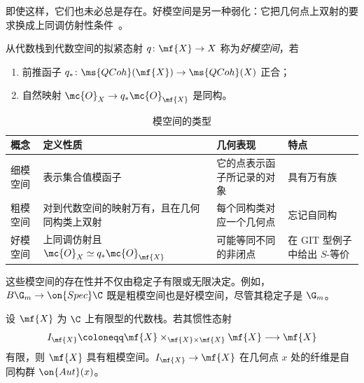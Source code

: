 即使这样，它们也未必总是存在。好模空间是另一种弱化：它把几何点上双射的要求换成上同调仿射性条件~\cite{Alper2013}。

\begin{defn}
    从代数栈到代数空间的拟紧态射 \(q\colon\mf{X}\to X\) 称为\textit{好模空间}，若
    \begin{enumerate}
        \item 前推函子 \(q_*\colon\ms{QCoh}(\mf{X})\to\ms{QCoh}(X)\) 正合；
        \item 自然映射 \(\mc{O}_X\to q_*\mc{O}_{\mf{X}}\) 是同构。
    \end{enumerate}
\end{defn}

\begin{table}[htpb]
    \centering
    \caption{模空间的类型}
    \label{tab:moduli-types-corrected}
    \renewcommand{\arraystretch}{1.3}
    \begin{tabular}{
        p{}
        p{}
        p{}
        p{}
    }
        \toprule
        \textbf{概念}
        & \textbf{定义性质}
        & \textbf{几何表现}
        & \textbf{特点}
        \\
        \midrule
        细模空间
        & 表示集合值模函子
        & 它的点表示函子所记录的对象
        & 具有万有族
        \\
        粗模空间
        & 对到代数空间的映射万有，且在几何同构类上双射
        & 每个同构类对应一个几何点
        & 忘记自同构
        \\
        好模空间
        & 上同调仿射且
          \(\mc{O}_X \simeq q_*\mc{O}_{\mf{X}}\)
        & 可能等同不同的非闭点
        & 在 GIT 型例子中给出 \(S\)-等价
        \\
        \bottomrule
    \end{tabular}
\end{table}

这些模空间的存在性并不仅由稳定子有限或无限决定。例如，\(B\G_m\to\on{Spec}\C\) 既是粗模空间也是好模空间，尽管其稳定子是 \(\G_m\)。

\begin{thm}
    设 \(\mf{X}\) 为 \(\C\) 上有限型的代数栈。若其惯性态射
    \[
        I_{\mf{X}}
        \coloneqq
        \mf{X}\times_{\mf{X}\times\mf{X}}\mf{X}
        \longrightarrow \mf{X}
    \]
    有限，则 \(\mf{X}\) 具有粗模空间。\(I_{\mf{X}}\to\mf{X}\) 在几何点 \(x\) 处的纤维是自同构群 \(\on{Aut}(x)\)。
\end{thm}

